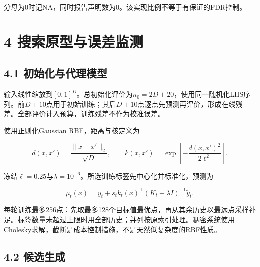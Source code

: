 \documentclass[11pt,a4paper]{article}
\begin{document}
分母为0时记NA，同时报告声明数为0。该实现比例不等于有保证的FDR控制。

\hypertarget{ux641cux7d22ux539fux578bux4e0eux8befux5deeux76d1ux6d4b}{%
\section{4
搜索原型与误差监测}\label{ux641cux7d22ux539fux578bux4e0eux8befux5deeux76d1ux6d4b}}

\hypertarget{ux521dux59cbux5316ux4e0eux4ee3ux7406ux6a21ux578b}{%
\subsection{4.1
初始化与代理模型}\label{ux521dux59cbux5316ux4e0eux4ee3ux7406ux6a21ux578b}}

输入线性缩放到\([0,1]^D\)。总初始化评价为\(n_0=2D+20\)，使用同一随机化LHS序列。前\(D+10\)点用于初始训练；其后\(D+10\)点逐点先预测再评价，形成在线残差。全部评价计入预算，训练残差不作为校准误差。

\par\noindent\begin{minipage}{\linewidth}

使用正则化Gaussian RBF，距离与核定义为

\[
d(x,x')=\frac{\|x-x'\|_2}{\sqrt D},\qquad k(x,x')=\exp\left[-\frac{d(x,x')^2}{2\ell^2}\right].
\]

\end{minipage}\par

\par\noindent\begin{minipage}{\linewidth}

冻结\(\ell=0.25\)与\(\lambda=10^{-6}\)。所选训练标签先中心化并标准化，预测为

\[
\mu_t(x)=\bar y_t+s_t k_t(x)^\top(K_t+\lambda I)^{-1}\widetilde y_t.
\]

\end{minipage}\par

每轮训练最多256点：先取最多128个目标值最优点，再从其余历史以最远点采样补足。标签数量未超过上限时用全部历史；并列按原索引处理。稠密系统使用Cholesky求解，截断是成本控制措施，不是天然低复杂度的RBF性质。

\hypertarget{ux5019ux9009ux751fux6210}{%
\subsection{4.2 候选生成}\label{ux5019ux9009ux751fux6210}}
\end{document}
